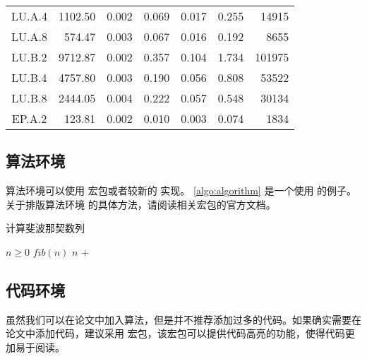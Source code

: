 \begin{ThreePartTable}
\begin{longtable}[c]{c*{6}{r}}
    LU.A.4                 & 1102.50                             & 0.002                               & 0.069          & 0.017 & 0.255 & 14915  \\
    LU.A.8                 & 574.47                              & 0.003                               & 0.067          & 0.016 & 0.192 & 8655   \\
    LU.B.2                 & 9712.87                             & 0.002                               & 0.357          & 0.104 & 1.734 & 101975 \\
    LU.B.4                 & 4757.80                             & 0.003                               & 0.190          & 0.056 & 0.808 & 53522  \\
    LU.B.8                 & 2444.05                             & 0.004                               & 0.222          & 0.057 & 0.548 & 30134  \\
    EP.A.2                 & 123.81                              & 0.002                               & 0.010          & 0.003 & 0.074 & 1834   \\
    \bottomrule
  \end{longtable}
\end{ThreePartTable}



\subsection{算法环境}

算法环境可以使用  宏包或者较新的  实现。
\cref{algo:algorithm} 是一个使用  的例子。关于排版算法环境
的具体方法，请阅读相关宏包的官方文档。

\begin{algorithm}
  \caption{计算斐波那契数列}\label{algo:algorithm}
  \begin{algorithmic}[1]
    \Require $n \geq 0$
    \Ensure $fib(n)$
    \State \Return $n$
    \Else
    \State \Return {} + 
    \EndIf
    \EndFunction
  \end{algorithmic}
\end{algorithm}

\subsection{代码环境}

虽然我们可以在论文中加入算法，但是并不推荐添加过多的代码。如果确实需要在论文中添加代码，建议采用  宏包，该宏包可以提供代码高亮的功能，使得代码更加易于阅读。

